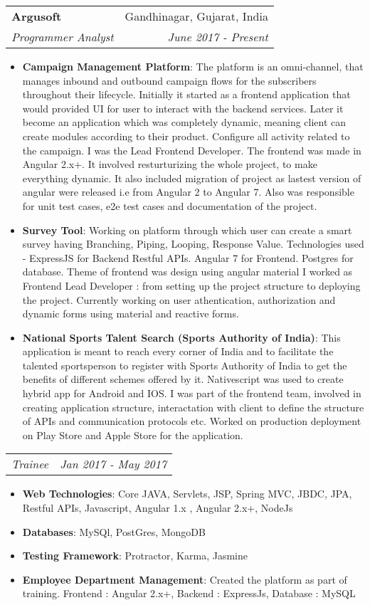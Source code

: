 \documentclass[letterpaper,11pt]{article}
\makeatletter
\newcommand{\resumeItem}[2]{
  \item\small{
    \textbf{#1}{: #2 \vspace{-2pt}}
  }
}
\newcommand{\resumeSubheading}[4]{
  \vspace{-1pt}\item
    \begin{tabular*}{0.97\textwidth}{l@{\extracolsep{\fill}}r}
      \textbf{#1} & #2 \\
      \textit{\small#3} & \textit{\small #4} \\
    \end{tabular*}\vspace{-5pt}
}
\newcommand{\resumeSubSubheading}[2]{
	\vspace{-1pt}
	\begin{tabular*}{0.97\textwidth}{l@{\extracolsep{\fill}}r}
		\textit{\small#1} & \textit{\small #2} \\
	\end{tabular*}\vspace{-5pt}
}
\newcommand{\resumeItemListStart}{\begin{itemize}}
\newcommand{\resumeItemListEnd}{\end{itemize}\vspace{-5pt}}
\makeatother
\begin{document}
    \resumeSubheading
      {Argusoft}{Gandhinagar, Gujarat, India}
      {Programmer Analyst}{June 2017 - Present}
      \resumeItemListStart
		\resumeItem{Campaign Management Platform}
		  {The platform is an omni-channel, that manages inbound and outbound campaign
		  	flows for the subscribers throughout their lifecycle.
		  	Initially it started as a frontend application that would provided UI for user to interact with the backend services. Later it become an application which was completely dynamic, meaning client can create modules according to their product. Configure all activity related to the campaign.
		  	I was the Lead Frontend Developer. The frontend was made in Angular 2.x+. It involved resturturizing the whole project, to make everything dynamic. It also included migration of project as lastest version of angular were released i.e from Angular 2 to Angular 7. Also was responsible for unit test cases, e2e test cases and documentation of the project.
	  	}
        \resumeItem{Survey Tool}
          {Working on platform through which user can create a smart survey having Branching, Piping, Looping, Response Value. Technologies used - ExpressJS for Backend Restful APIs. Angular 7 for Frontend. Postgres for database. Theme of frontend was design using angular material I worked as Frontend Lead Developer : from setting up the project structure to deploying the project. Currently working on user athentication, authorization and dynamic forms using material and reactive forms.}
        \resumeItem{National Sports Talent Search (Sports Authority of India)}
          {
           This application is meant to reach every corner of India and to facilitate the talented sportsperson to
          register with Sports Authority of India to get the benefits of different schemes offered by it.
          Nativescript was used to create hybrid app for Android and IOS. I was part of the frontend team, involved in creating application structure, interactation with client to define the structure of APIs and communication protocols etc.
          Worked on production deployment on Play Store and Apple Store for the application.
          }
      \resumeItemListEnd
    \resumeSubSubheading
      {Trainee}{Jan 2017 - May 2017}
      \resumeItemListStart
        \resumeItem{Web Technologies}
          {Core JAVA, Servlets, JSP, Spring MVC, JBDC, JPA, Restful APIs, Javascript, Angular 1.x , Angular 2.x+, NodeJs }
           \resumeItem{Databases}
          {MySQl, PostGres, MongoDB }
           \resumeItem{Testing Framework}
{Protractor, Karma, Jasmine }
        \resumeItem{Employee Department Management}
          {Created the platform as part of training. Frontend : Angular 2.x+, Backend : ExpressJs, Database : MySQL }
      \resumeItemListEnd
\end{document}
